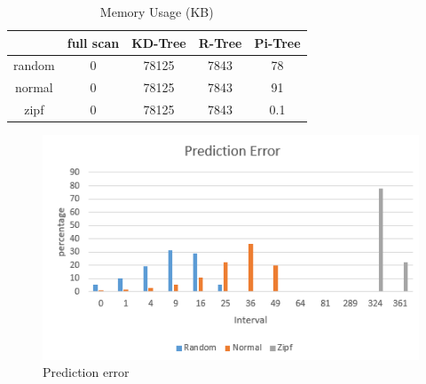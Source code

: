 \documentclass[sigconf,10pt]{acmart}
\begin{document}
\begin{table}[h]
  \centering
  \begin{tabular}{|c|c|c|c|c|}
    \hline
          & full scan & KD-Tree & R-Tree & Pi-Tree \\
    \hline
    random & 0 & 78125 & 7843 & 78 \\
    \hline
    normal & 0 & 78125 & 7843 & 91 \\
    \hline
    zipf & 0 & 78125 & 7843 & 0.1 \\
    \hline 
  \end{tabular}
  \caption{Memory Usage (KB)}
  \label{table:mem}
\end{table}

\begin{figure}[h]
  \includegraphics[scale=0.6]{../figures/addition/prediction-error}
  \caption{Prediction error}
  \label{prediction-error}
\end{figure}
\end{document}
